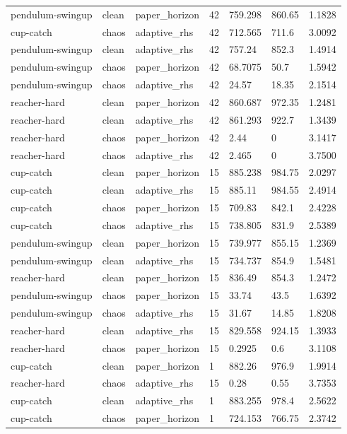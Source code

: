 \begin{tabular}{lllllll}
pendulum-swingup & clean & paper\_horizon & 42 & 759.298 & 860.65 & 1.1828 \\
cup-catch & chaos & adaptive\_rhs & 42 & 712.565 & 711.6 & 3.0092 \\
pendulum-swingup & clean & adaptive\_rhs & 42 & 757.24 & 852.3 & 1.4914 \\
pendulum-swingup & chaos & paper\_horizon & 42 & 68.7075 & 50.7 & 1.5942 \\
pendulum-swingup & chaos & adaptive\_rhs & 42 & 24.57 & 18.35 & 2.1514 \\
reacher-hard & clean & paper\_horizon & 42 & 860.687 & 972.35 & 1.2481 \\
reacher-hard & clean & adaptive\_rhs & 42 & 861.293 & 922.7 & 1.3439 \\
reacher-hard & chaos & paper\_horizon & 42 & 2.44 & 0 & 3.1417 \\
reacher-hard & chaos & adaptive\_rhs & 42 & 2.465 & 0 & 3.7500 \\
cup-catch & clean & paper\_horizon & 15 & 885.238 & 984.75 & 2.0297 \\
cup-catch & clean & adaptive\_rhs & 15 & 885.11 & 984.55 & 2.4914 \\
cup-catch & chaos & paper\_horizon & 15 & 709.83 & 842.1 & 2.4228 \\
cup-catch & chaos & adaptive\_rhs & 15 & 738.805 & 831.9 & 2.5389 \\
pendulum-swingup & clean & paper\_horizon & 15 & 739.977 & 855.15 & 1.2369 \\
pendulum-swingup & clean & adaptive\_rhs & 15 & 734.737 & 854.9 & 1.5481 \\
reacher-hard & clean & paper\_horizon & 15 & 836.49 & 854.3 & 1.2472 \\
pendulum-swingup & chaos & paper\_horizon & 15 & 33.74 & 43.5 & 1.6392 \\
pendulum-swingup & chaos & adaptive\_rhs & 15 & 31.67 & 14.85 & 1.8208 \\
reacher-hard & clean & adaptive\_rhs & 15 & 829.558 & 924.15 & 1.3933 \\
reacher-hard & chaos & paper\_horizon & 15 & 0.2925 & 0.6 & 3.1108 \\
cup-catch & clean & paper\_horizon & 1 & 882.26 & 976.9 & 1.9914 \\
reacher-hard & chaos & adaptive\_rhs & 15 & 0.28 & 0.55 & 3.7353 \\
cup-catch & clean & adaptive\_rhs & 1 & 883.255 & 978.4 & 2.5622 \\
cup-catch & chaos & paper\_horizon & 1 & 724.153 & 766.75 & 2.3742 \\

\end{tabular}
